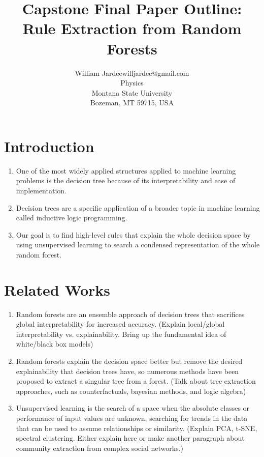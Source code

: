 \documentclass[twoside,11pt]{article}
\begin{document}
\title{Capstone Final Paper Outline: Rule Extraction from Random Forests}

\author{\name William Jardee\email willjardee@gmail.com \\
       \addr Physics\\
       Montana State University\\
       Bozeman, MT 59715, USA
       }

\maketitle

 
\section{Introduction}
\begin{enumerate}
\item One of the most widely applied structures applied to machine learning problems is the decision tree because of its interpretability and ease of implementation. 
\item Decision trees are a specific application of a broader topic in machine learning called inductive logic programming.
\item Our goal is to find high-level rules that explain the whole decision space by using unsupervised learning to search a condensed representation of the whole random forest. 
\end{enumerate}
	

\section{Related Works}
\begin{enumerate}
\item Random forests are an ensemble approach of decision trees that sacrifices global interpretability for increased accuracy. (Explain local/global interpretability vs. explainability. Bring up the fundamental idea of white/black box models)
\item Random forests explain the decision space better but remove the desired explainability that decision trees have, so numerous methods have been proposed to extract a singular tree from a forest. (Talk about tree extraction approaches, such as counterfactuals, bayesian methods, and logic algebra)
\item Unsupervised learning is the search of a space when the absolute classes or performance of input values are unknown, searching for trends in the data that can be used to assume relationships or similarity. (Explain PCA, t-SNE, spectral clustering. Either explain here or make another paragraph about community extraction from complex social networks.)
\end{enumerate}
\end{document}

